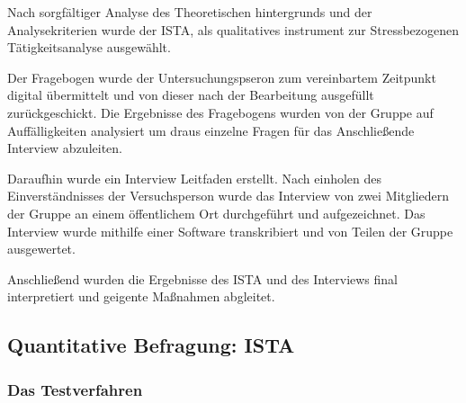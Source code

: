 \documentclass[12pt, a4paper]{article}
\begin{document}
Nach sorgfältiger Analyse des Theoretischen 
hintergrunds und der Analysekriterien wurde der ISTA, als qualitatives instrument zur 
Stressbezogenen Tätigkeitsanalyse ausgewählt.

Der Fragebogen wurde der Untersuchungspseron zum vereinbartem Zeitpunkt digital übermittelt und 
von dieser nach der Bearbeitung ausgefüllt zurückgeschickt. Die Ergebnisse des Fragebogens wurden 
von der Gruppe auf Auffälligkeiten analysiert um draus einzelne Fragen für das Anschließende 
Interview abzuleiten. 

Daraufhin wurde ein Interview Leitfaden erstellt. 
Nach einholen des Einverständnisses der Versuchsperson wurde das Interview von zwei Mitgliedern 
der Gruppe an einem öffentlichem Ort durchgeführt und aufgezeichnet. Das Interview wurde
mithilfe einer Software transkribiert und von Teilen der Gruppe ausgewertet. 

Anschließend wurden die Ergebnisse des ISTA und des Interviews final interpretiert und 
geigente Maßnahmen abgleitet. 



\subsection{Quantitative Befragung: ISTA}

\subsubsection{Das Testverfahren}
\end{document}
